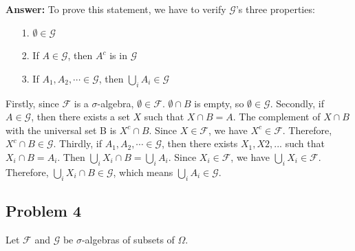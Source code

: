 \documentclass[12pt]{article}
\begin{document}
\textbf{Answer:} 
To prove this statement, we have to verify $\mathcal{G}$'s three properties:
\begin{enumerate}
    \item[1.] $\emptyset\in\mathcal{G}$
    \item[2.] If $A\in\mathcal{G}$, then $A^c$ is in $\mathcal{G}$
    \item[3.] If $A_{1},A_{2},\cdots\in\mathcal{G}$, then $\bigcup_{i}A_{i}\in\mathcal{G}$
\end{enumerate}
Firstly, since $\mathcal{F}$ is a $\sigma$-algebra, $\emptyset\in\mathcal{F}$. $\emptyset \cap B$ is empty, so $\emptyset \in\mathcal{G}$. Secondly, if $A\in\mathcal{G}$, then there exists a set $X$ such that $X \cap B = A$. The complement of $X \cap B$ with the universal set B is $X^{c} \cap B$. Since $X \in \mathcal{F}$, we have $X^{c} \in \mathcal{F}$. Therefore, $X^{c} \cap B \in \mathcal{G}$. Thirdly, if $A_{1},A_{2},\cdots\in\mathcal{G}$, then there exists $X_1, X2,...$ such that $X_i \cap B = A_i$. Then $\bigcup_{i}X_i \cap B = \bigcup_{i}A_i$. Since $X_i \in \mathcal{F}$, we have $\bigcup_{i}X_i \in \mathcal{F}$. Therefore, $\bigcup_{i}X_i \cap B \in \mathcal{G}$, which means $\bigcup_{i}A_i \in \mathcal{G}$. \\

\subsection*{Problem 4}
Let $\mathcal{F}$ and $\mathcal{G}$ be $\sigma$-algebras of subsets of $\Omega$.
\end{document}
